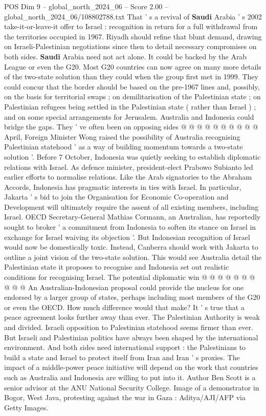 \begin{textsample}{POS Dim 9 – global\_north\_2024\_06 – Score 2.00 – global\_north\_2024\_06/108802788.txt}
That ' s a revival of \textbf{Saudi} Arabia ' s 2002 take-it-or-leave-it offer to Israel : recognition in return for a full withdrawal from the territories occupied in 1967.
Riyadh should refine that blunt demand, drawing on Israeli-Palestinian negotiations since then to detail necessary compromises on both sides. \textbf{Saudi} Arabia need not act alone.
It could be backed by the Arab League or even the G20.
Most G20 countries can now agree on many more details of the two-state solution than they could when the group first met in 1999.
They could concur that the border should be based on the pre-1967 lines and, possibly, on the basis for territorial swaps ; on demilitarisation of the Palestinian state ; on Palestinian refugees being settled in the Palestinian state ( rather than Israel ) ; and on some special arrangements for Jerusalem.
Australia and Indonesia could bridge the gaps.
They ' ve often been on opposing sides @ @ @ @ @ @ @ @ @ @ April, Foreign Minister Wong raised the possibility of Australia recognising Palestinian statehood ' as a way of building momentum towards a two-state solution '.
Before 7 October, Indonesia was quietly seeking to establish diplomatic relations with Israel.
As defence minister, president-elect Prabowo Subianto led earlier efforts to normalise relations.
Like the Arab signatories to the Abraham Accords, Indonesia has pragmatic interests in ties with Israel.
In particular, Jakarta ' s bid to join the Organisation for Economic Co-operation and Development will ultimately require the assent of all existing members, including Israel.
OECD Secretary-General Mathias Cormann, an Australian, has reportedly sought to broker ' a commitment from Indonesia to soften its stance on Israel in exchange for Israel waiving its objection '.
But Indonesian recognition of Israel would now be domestically toxic.
Instead, Canberra should work with Jakarta to outline a joint vision of the two-state solution.
This would see Australia detail the Palestinian state it proposes to recognise and Indonesia set out realistic conditions for recognising Israel.
The potential diplomatic win @ @ @ @ @ @ @ @ @ @ An Australian-Indonesian proposal could provide the nucleus for one endorsed by a larger group of states, perhaps including most members of the G20 or even the OECD.
How much difference would that make?
It ' s true that a peace agreement looks further away than ever.
The Palestinian Authority is weak and divided.
Israeli opposition to Palestinian statehood seems firmer than ever.
But Israeli and Palestinian politics have always been shaped by the international environment.
And both sides need international support : the Palestinians to build a state and Israel to protect itself from Iran and Iran ' s proxies.
The impact of a middle-power peace initiative will depend on the work that countries such as Australia and Indonesia are willing to put into it.
Author Ben Scott is a senior advisor at the ANU National Security College.
Image of a demonstrator in Bogor, West Java, protesting against the war in Gaza : Aditya/AJI/AFP via Getty Images.

\end{textsample}
